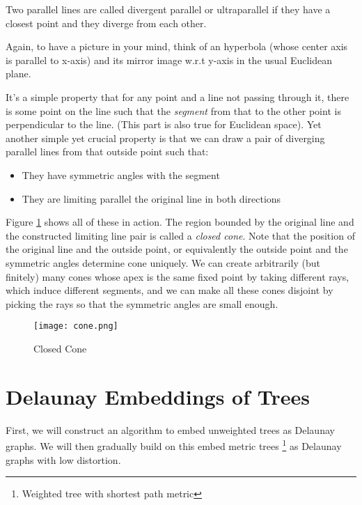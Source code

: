 \begin{definition}
Two parallel lines are called divergent parallel or ultraparallel if they have a closest point and they diverge from each other.
\end{definition}

Again, to have a picture in your mind, think of an hyperbola (whose center axis is parallel to x-axis) and its mirror image w.r.t y-axis in the usual Euclidean plane.

It's a simple property that for any point and a line not passing through it, there is some point on the line such that the \textit{segment} from that to the other point is perpendicular to the line. (This part is also true for Euclidean space). Yet another simple yet crucial property is that we can draw a pair of diverging parallel lines from that outside point such that:

\begin{itemize}
    \item They have symmetric angles with the segment
    \item They are limiting parallel the original line in both directions
\end{itemize}

Figure \ref{fig:cone} shows all of these in action. The region bounded by the original line and the constructed limiting line pair is called a \textit{closed cone}. Note that the position of the original line and the outside point, or equivalently the outside point and the symmetric angles determine cone uniquely. We can create arbitrarily (but finitely) many cones whose apex is the same fixed point by taking different rays, which induce different segments, and we can make all these cones disjoint by picking the rays so that the symmetric angles are small enough.

\begin{figure}
    \centering
    \texttt{[image: cone.png]}
    \caption{Closed Cone}
    \label{fig:cone}
\end{figure}

\section{Delaunay Embeddings of Trees}
First, we will construct an algorithm to embed unweighted trees as Delaunay graphs. We will then gradually build on this embed metric trees \footnote{Weighted tree with shortest path metric} as Delaunay graphs with low distortion.

